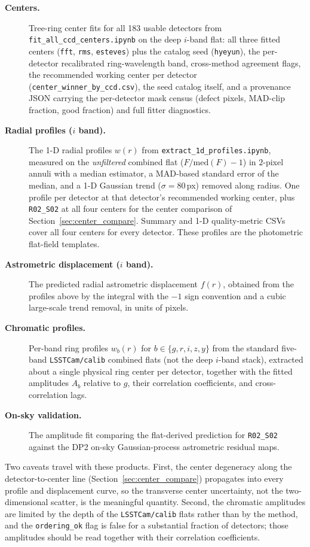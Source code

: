 \begin{description}

\item[\textbf{Centers.}] Tree-ring center fits for all 183 usable detectors from
\texttt{fit\_all\_ccd\_centers.ipynb} on the deep $i$-band flat: all three fitted centers
(\texttt{fft}, \texttt{rms}, \texttt{esteves}) plus the catalog seed (\texttt{hyeyun}), the
per-detector recalibrated ring-wavelength band, cross-method agreement flags, the recommended
working center per detector (\texttt{center\_winner\_by\_ccd.csv}), the seed catalog itself,
and a provenance JSON carrying the per-detector mask census (defect pixels, MAD-clip fraction,
good fraction) and full fitter diagnostics.

\item[\textbf{Radial profiles ($i$ band).}] The 1-D radial profiles $w(r)$ from
\texttt{extract\_1d\_profiles.ipynb}, measured on the \emph{unfiltered} combined flat
($F/\mathrm{med}(F)-1$) in $2$-pixel annuli with a median estimator, a MAD-based standard
error of the median, and a 1-D Gaussian trend ($\sigma=80$\,px) removed along radius. One
profile per detector at that detector's recommended working center, plus \texttt{R02\_S02}
at all four centers for the center comparison of Section~\ref{sec:center_compare}. Summary and 1-D
quality-metric CSVs cover all four centers for every detector. These profiles are the
photometric flat-field templates.

\item[\textbf{Astrometric displacement ($i$ band).}] The predicted radial astrometric displacement $f(r)$,
obtained from the profiles above by the \citet{Plazas2014} integral with the $-1$ sign
convention and a cubic large-scale trend removal, in units of pixels.

\item[\textbf{Chromatic profiles.}] Per-band ring profiles $w_b(r)$ for $b \in \{g,r,i,z,y\}$ from
the standard five-band \texttt{LSSTCam/calib} combined flats (not the deep $i$-band stack),
extracted about a single physical ring center per detector, together with the fitted
amplitudes $A_b$ relative to $g$, their correlation coefficients, and cross-correlation lags.

\item[\textbf{On-sky validation.}] The amplitude fit comparing the flat-derived prediction for
\texttt{R02\_S02} against the DP2 on-sky Gaussian-process astrometric residual maps.

\end{description}

Two caveats travel with these products. First, the center degeneracy along the
detector-to-center line (Section~\ref{sec:center_compare}) propagates into every profile and
displacement curve, so the transverse center uncertainty, not the two-dimensional scatter, is
the meaningful quantity. Second, the chromatic amplitudes are limited by the depth of the
\texttt{LSSTCam/calib} flats rather than by the method, and the \texttt{ordering\_ok} flag is
false for a substantial fraction of detectors; those amplitudes should be read together with
their correlation coefficients.

